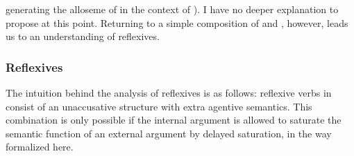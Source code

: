 \begin{exe}
\begin{xlist}
\begin{xlist}
\begin{exe}
\begin{xlist}
\begin{xlist}
\begin{exe}
\begin{xlist}
\begin{xlist}
\begin{exe}
\begin{exe}
\begin{xlist}
\begin{exe}
\begin{exe}
\begin{xlist}
\begin{exe}
\begin{exe}
\begin{exe}
\begin{exe}
\begin{exe}
\begin{xlist}
\begin{exe}
\begin{xlist}
\begin{exe}
\begin{exe}
\begin{xlist}
\begin{exe}
\begin{xlist}
\begin{exe}
\begin{exe}
\begin{exe}
\begin{xlist}
\begin{exe}
\begin{exe}
\begin{exe}
\begin{xlist}
\begin{exe}
\begin{xlist}
\begin{exe}
\begin{xlist}
\begin{exe}
\begin{xlist}
\begin{exe}
\begin{exe}
\begin{exe}
\begin{exe}
\begin{xlist}
\begin{exe}
\begin{xlist}
\begin{exe}
\begin{xlist}
\begin{exe}
\begin{xlist}
\begin{exe}
\begin{xlist}
\begin{exe}
\begin{xlist}
\begin{exe}
\begin{exe}
\begin{exe}
\begin{exe}
\begin{xlist}
\begin{exe}
\begin{xlist}
\begin{exe}
\begin{xlist}
\begin{exe}
\begin{exe}
\begin{xlist}
\begin{exe}
\begin{exe}
\begin{exe}
\begin{exe}
\begin{xlist}
\begin{xlist}
\begin{exe}
\begin{xlist}
\begin{exe}
\begin{exe}
\begin{exe}
\begin{xlist}
\begin{exe}
\begin{exe}
\begin{xlist}
\begin{exe}
\begin{exe}
\begin{exe}
\begin{xlist}
\begin{xlist}
\begin{exe}
\begin{xlist}
\begin{exe}
\begin{exe}
\begin{exe}
\begin{exe}
\begin{xlist}
\begin{exe}
\begin{xlist}
\begin{exe}
\begin{xlist}
\begin{exe}
\begin{exe}
generating the  alloseme of {\vz} in the context of {\va}). I have no deeper explanation to propose at this point. Returning to a simple composition of {\vz} and {\va}, however, leads us to an understanding of reflexives.

		\subsubsection{Reflexives} \label{vz:va:vzva:refl}
The intuition behind the analysis of reflexives is as follows: reflexive verbs in {\thit} consist of an unaccusative structure with extra agentive semantics. This combination is only possible if the internal argument is allowed to saturate the semantic function of an external argument by delayed saturation, in the way formalized here.


\end{exe}
\end{exe}
\end{xlist}
\end{exe}
\end{xlist}
\end{exe}
\end{xlist}
\end{exe}
\end{exe}
\end{exe}
\end{exe}
\end{xlist}
\end{exe}
\end{xlist}
\end{xlist}
\end{exe}
\end{exe}
\end{exe}
\end{xlist}
\end{exe}
\end{exe}
\end{xlist}
\end{exe}
\end{exe}
\end{exe}
\end{xlist}
\end{exe}
\end{xlist}
\end{xlist}
\end{exe}
\end{exe}
\end{exe}
\end{exe}
\end{xlist}
\end{exe}
\end{exe}
\end{xlist}
\end{exe}
\end{xlist}
\end{exe}
\end{xlist}
\end{exe}
\end{exe}
\end{exe}
\end{exe}
\end{xlist}
\end{exe}
\end{xlist}
\end{exe}
\end{xlist}
\end{exe}
\end{xlist}
\end{exe}
\end{xlist}
\end{exe}
\end{xlist}
\end{exe}
\end{exe}
\end{exe}
\end{exe}
\end{xlist}
\end{exe}
\end{xlist}
\end{exe}
\end{xlist}
\end{exe}
\end{xlist}
\end{exe}
\end{exe}
\end{exe}
\end{xlist}
\end{exe}
\end{exe}
\end{exe}
\end{xlist}
\end{exe}
\end{xlist}
\end{exe}
\end{exe}
\end{xlist}
\end{exe}
\end{xlist}
\end{exe}
\end{exe}
\end{exe}
\end{exe}
\end{exe}
\end{xlist}
\end{exe}
\end{exe}
\end{xlist}
\end{exe}
\end{exe}
\end{xlist}
\end{xlist}
\end{exe}
\end{xlist}
\end{xlist}
\end{exe}
\end{xlist}
\end{xlist}
\end{exe}
